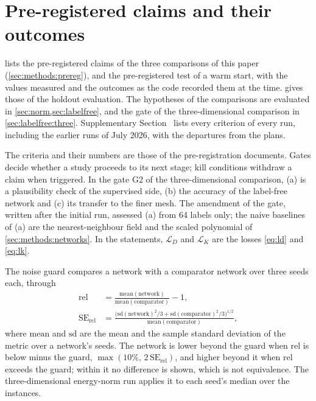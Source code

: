 \section{Pre-registered claims and their outcomes}\label{app:claims}
\setcounter{table}{0}

 lists the pre-registered claims of the three comparisons of this paper
(\cref{sec:methods:prereg}), and the pre-registered test of a warm start, with the values measured and the outcomes as the code recorded them at the time.
 gives
those of the holdout evaluation. The hypotheses of the comparisons are evaluated in
\cref{sec:norm,sec:labelfree}, and the gate of the three-dimensional comparison in
\cref{sec:labelfree:three}. Supplementary Section~\SuppPrereg{} lists every criterion of every
run, including the earlier runs of July 2026, with the departures from the plans.

The criteria and their numbers are those of the pre-registration documents. Gates
decide whether a study proceeds to its next stage; kill conditions withdraw a claim when
triggered. In the gate G2 of the three-dimensional comparison, (a) is a plausibility check of
the supervised side, (b) the accuracy of the label-free network and (c) its transfer to the finer mesh. The amendment of the gate, written after the initial
run, assessed (a) from 64 labels only; the naive baselines of (a) are the nearest-neighbour field and the scaled
polynomial of \cref{sec:methods:networks}. In the statements, $\mathcal{L}_D$ and
$\mathcal{L}_K$ are the losses \eqref{eq:ld} and \eqref{eq:lk}.

The noise guard compares a network with a comparator network over three seeds each, through
\begin{equation}
\begin{split}
\mathrm{rel}&=\frac{\mathrm{mean}(\text{network})}{\mathrm{mean}(\text{comparator})}-1,\\
\mathrm{SE}_{\mathrm{rel}}&=\frac{\bigl(\mathrm{sd}(\text{network})^2/3
+\mathrm{sd}(\text{comparator})^2/3\bigr)^{1/2}}{\mathrm{mean}(\text{comparator})},
\end{split}
\label{eq:guard}
\end{equation}
where $\mathrm{mean}$ and $\mathrm{sd}$ are the mean and the sample standard deviation of the metric over a network's seeds. The network is lower beyond the guard when $\mathrm{rel}$ is below minus the guard,
$\max(10\%,\,2\,\mathrm{SE}_{\mathrm{rel}})$, and higher beyond it when $\mathrm{rel}$
exceeds the guard; within it no difference is shown, which is not equivalence. The
three-dimensional energy-norm run applies it to each seed's median over the instances.


